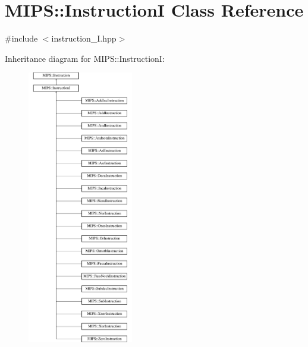 \hypertarget{classMIPS_1_1InstructionI}{}\section{M\+I\+PS\+:\+:InstructionI Class Reference}
\label{classMIPS_1_1InstructionI}


{\ttfamily \#include $<$instruction\+\_\+\+I.\+hpp$>$}

Inheritance diagram for M\+I\+PS\+:\+:InstructionI\+:\begin{figure}[H]
\begin{center}
\leavevmode
\includegraphics[height=12.000000cm]{classMIPS_1_1InstructionI}
\end{center}
\end{figure}
